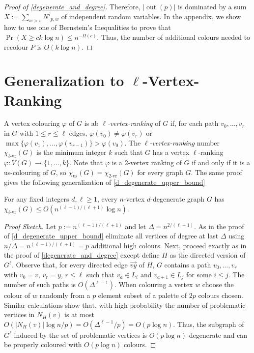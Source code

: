 \documentclass{patmorin}
\newcommand{\defin}[1]{\emph{\color{brightmaroon}#1}}
\DeclareMathOperator{\outn}{out}
\newcommand{\rn}[1]{\chi_{\operatorname{#1-vr}}}
\newcommand{\trn}{\chi_{\mathrm{us}}}
\newcommand{\lrn}{\rn{\ell}}
\begin{document}
\begin{proof}[Proof of \cref{degenerate_and_degree}]
  Therefore, $|\outn(p)|$ is dominated by a sum $X:=\sum_{w> v} N'_{p,w}$ of independent random variables.  In the appendix, we show how to use one of Bernstein's Inequalities to prove that $\Pr(X\ge ck\log n)\le n^{-\Omega(c)}$.  Thus, the number of additional colours needed to recolour $P$ is $O(k\log n)$.
\end{proof}

\section{Generalization to $\ell$-Vertex-Ranking}

A vertex colouring $\varphi$ of $G$ is ab \defin{$\ell$-vertex-ranking} of $G$ if, for each path $v_0,\ldots,v_r$ in $G$ with $1\le r\le\ell$ edges, $\varphi(v_0)\neq \varphi(v_r)$ or $\max\{\varphi(v_1),\ldots,\varphi(v_{r-1})\}>\varphi(v_0)$.  The \defin{$\ell$-vertex-ranking} number $\lrn(G)$ is the minimum integer $k$ such that $G$ has a vertex $\ell$-ranking $\varphi:V(G)\to\{1,\ldots,k\}$.  Note that $\varphi$ is a $2$-vertex ranking of $G$ if and only if it is a us-colouring of $G$, so $\trn(G)=\rn{2}(G)$ for every graph $G$.  The same proof gives the following generalization of \cref{d_degenerate_upper_bound}

\begin{thm}
  For any fixed integers $d,\ell\ge 1$, every $n$-vertex $d$-degenerate graph $G$ has $\lrn(G) \le O(n^{(\ell-1)/(\ell+1)}\log  n)$.
\end{thm}

\begin{proof}[Proof Sketch]
  Let $p:=n^{(\ell-1)/(\ell+1)}$ and let $\Delta=n^{2/(\ell+1)}$.  As in the proof of \cref{d_degenerate_upper_bound} eliminate all vertices of degree at last $\Delta$ using $n/\Delta = n^{(\ell-1)/(\ell+1)}=p$ additional high colours.  Next, proceed exactly as in the proof of \cref{degenerate_and_degree} except define $H$ as the directed version of $G^{\ell}$.  Observe that, for every directed edge $\overrightarrow{vy}$ of $H$, $G$ contains a path $v_0,\ldots,v_r$ with $v_0=v$, $v_r=y$, $r\le \ell$ such that $v_a\in L_i$ and $v_{a+1}\in L_j$ for some $i\le j$.  The number of such paths is $O(\Delta^{\ell-1})$. When colouring a vertex $w$ choose the colour of $w$ randomly from a $p$ element subset of a palette of $2p$ colours chosen.  Similar calculations show that, with high probability the number of problematic vertices in $N_{H}(v)$ is at most $O(|N_{H}(v)|\log n/p)=O(\Delta^{\ell-1}/p)=O(p\log n)$.  Thus, the subgraph of $G^\ell$ induced by the set of problematic vertices is $O(p\log n)$-degenerate and can be properly coloured with $O(p\log n)$ colours.
\end{proof}
\end{document}

